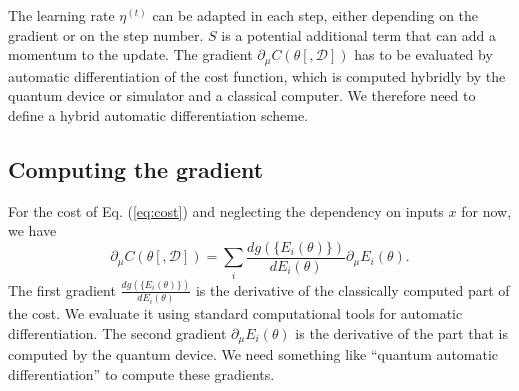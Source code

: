 \documentclass[aps,pra,10pt,twocolumn,groupedaddress,nofootinbib]{revtex4-1}
\theoremstyle{plain}
\begin{document}
The learning rate $\eta^{(t)}$ can be adapted in each step, either
depending on the gradient or on the step number. $S$ is a potential
additional term that can add a momentum to the update. The gradient
$\partial_{\mu} C(\theta[, \mathcal{D}])$ has to be evaluated by
automatic differentiation of the cost function, which is computed
hybridly by the quantum device or simulator and a classical
computer. We therefore need to define a hybrid automatic
differentiation scheme.

\subsection{Computing the gradient}
For the cost of Eq. (\ref{eq:cost}) and neglecting the dependency on inputs $x$ for now, we have
\[\partial_{\mu} C(\theta[, \mathcal{D}]) = \sum_i \frac{d g(\{E_i(\theta)\})}{d E_i(\theta)} \partial_{\mu} E_i(\theta). \]
The first gradient $\frac{d g(\{E_i(\theta)\})}{d E_i(\theta)}$ is the
derivative of the classically computed part of the cost. We evaluate
it using standard computational tools for automatic
differentiation. The second gradient $\partial_{\mu} E_i(\theta)$ is
the derivative of the part that is computed by the quantum device. We
need something like ``quantum automatic differentiation'' to compute
these gradients.
\end{document}
